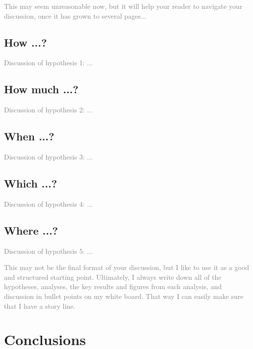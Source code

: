 \documentclass[
  journal=pasa,
  manuscript=Research-Article,
  year=2025,
  volume=X,
]{cup-journal}
\newcommand{\comment}[1]{\textcolor{gray}{#1}}
\begin{document}
\comment{This may seem unreasonable now, but it will help your reader to navigate your discussion, once it has grown to several pages...}

\subsection{How ...?} \label{sec:discussion_hypothesis1}

\comment{Discussion of hypothesis 1: ...}

\subsection{How much ...?} \label{sec:discussion_hypothesis2}

\comment{Discussion of hypothesis 2: ...}

\subsection{When ...?} \label{sec:discussion_hypothesis3}

\comment{Discussion of hypothesis 3: ...}

\subsection{Which ...?} \label{sec:discussion_hypothesis4}

\comment{Discussion of hypothesis 4: ...}

\subsection{Where ...?} \label{sec:discussion_hypothesis5}

\comment{Discussion of hypothesis 5: ...}


\comment{This may not be the final format of your discussion, but I like to use it as a good and structured starting point. Ultimately, I always write down all of the hypotheses, analyses, the key results and figures from each analysis, and discussion in bullet points on my white board. That way I can easily make sure that I have a story line.}

\clearpage
\section{Conclusions} \label{sec:conclusions}
\end{document}
